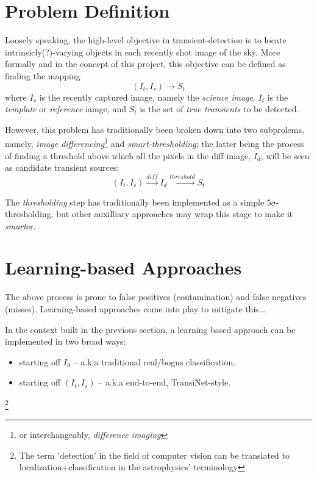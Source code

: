 \section{Problem Definition}

Loosely speaking, the high-level objective in transient-detection is to locate intrinsicly(?)-varying objects in each recently shot image of the sky.
More formally and in the concept of this project, this objective can be defined as finding the mapping
\begin{equation}
  \label{eq:def1}
  (I_t,I_s) \longrightarrow S_t 
\end{equation}
where $I_s$ is the recently captured image, namely the \emph{science image}. $I_t$ is the \emph{template} or \emph{reference} iamge, and $S_t$ is the set of \emph{true transients} to be detected.

However, this problem has traditionally been broken down into two subprolems, namely, \emph{image differencing}\footnote{or interchangeably, \emph{difference imaging}} and \emph{smart-thresholding}; the latter being the process of finding a threshold above which all the pixels in the diff image, $I_d$, will be seen as candidate transient sources:
\begin{equation}
  \label{eq:def2}
  (I_t,I_s) \xrightarrow{diff} I_d \xrightarrow{threshold} S_t 
\end{equation}

The \emph{thresholding} step has traditionally been implemented as a simple $5\sigma$-thresholding, but other auxilliary approaches may wrap this stage to make it \emph{smart}er.

\section{Learning-based Approaches}
\label{sec:learning}
The above process is prone to false positives (contamination) and false negatives (misses). Learning-based approaches come into play to mitigate this...

In the context built in the previous section, a learning based approach can be implemented in two broad ways:
\begin{itemize}
\item starting off $I_d$ -- a.k.a traditional real/bogus classification.
\item starting off $(I_t,I_s)$ -- a.k.a end-to-end, TransiNet-style.
\end{itemize}

\footnote{The term 'detection' in the field of computer vision can be translated to localization+classification in the astrophysics' terminology}

